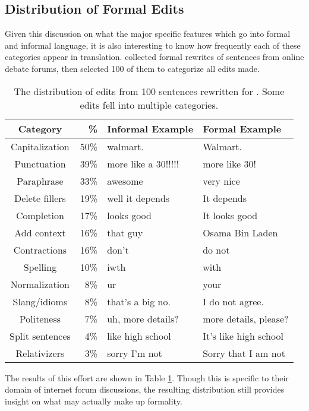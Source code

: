 \subsection{Distribution of Formal Edits}

Given this discussion on what the major specific features which go into formal and informal language, it is also interesting to know how frequently each of these categories appear in translation. \cite{pavlick2016empirical} collected formal rewrites of sentences from online debate forums, then selected 100 of them to categorize all edits made.

\begin{table}[h]
\centering
 \begin{tabular}{||c | r | l | l ||} 
 \hline
 Category & \% & Informal Example & Formal Example \\ [0.3ex] 
 \hline\hline
 Capitalization & 50\% & walmart. & Walmart. \\ 
 \hline
 Punctuation & 39\% & more like a 30!!!!! & more like 30! \\
 \hline
 Paraphrase & 33\% & awesome & very nice \\
 \hline
 Delete fillers & 19\% & well it depends & It depends \\
 \hline
 Completion & 17\% & looks good & It looks good \\
 \hline
 Add context & 16\% & that guy & Osama Bin Laden \\
 \hline
 Contractions & 16\% & don't & do not \\
 \hline
 Spelling & 10\% & iwth & with \\
 \hline
 Normalization & 8\% & ur & your \\
 \hline
 Slang/idioms & 8\% & that's a big no. & I do not agree. \\
 \hline
 Politeness & 7\% & uh, more details? & more details, please? \\
 \hline
 Split sentences & 4\% & like high school & It's like high school \\
 \hline
 Relativizers & 3\% & sorry I'm not & Sorry that I am not \\ 
 \hline
\end{tabular}
\caption{The distribution of edits from 100 sentences rewritten for \cite{pavlick2016empirical}. Some edits fell into multiple categories.}
\label{pavlick2016table}
\end{table}

The results of this effort are shown in Table \ref{pavlick2016table}. Though this is specific to their domain of internet forum discussions, the resulting distribution still provides insight on what may actually make up formality.


